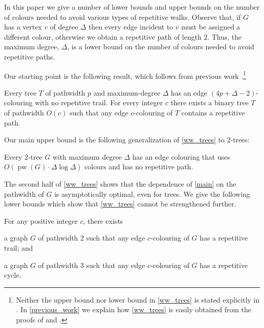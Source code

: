 \documentclass[kpfonts]{patmorin}
\DeclareMathOperator{\pw}{pw}
\begin{document}
In this paper we give a number of lower bounds and upper bounds on the number of colours needed to avoid various types of repetitive walks. Observe that, if $G$ has a vertex $v$ of degree $\Delta$ then every edge incident to $v$ must be assigned a different colour, otherwise we obtain a repetitive path of length $2$. Thus, the maximum degree, $\Delta$, is a lower bound on the number of colours needed to avoid repetitive paths.

Our starting point is the following result, which follows from previous work \cite{wilson.wood:anagram-free,kamcev.luczak.ea:anagram-free}.\footnote{Neither the upper bound nor lower bound in \cref{ww_trees} is stated explicitly in \cite{wilson.wood:anagram-free,kamcev.luczak.ea:anagram-free}.  In \cref{previous_work} we explain how \cref{ww_trees} is easily obtained from the proofs of \cite[Theorems~2 and 13]{wilson.wood:anagram-free} and \cite[Proposition~2.1]{kamcev.luczak.ea:anagram-free}.}

\begin{thm}\label{ww_trees}
    Every tree $T$ of pathwidth $p$ and maximum-degree $\Delta$ has an edge $(4p+\Delta-2)$-colouring with no repetitive trail.  For every integer $c$ there exists a binary tree $T$ of pathwidth $O(c)$ such that any edge $c$-colouring of $T$ contains a repetitive path.
\end{thm}

Our main upper bound is the following generalization of \cref{ww_trees} to $2$-trees:

\begin{thm}\label{main}
    Every $2$-tree $G$ with maximum degree $\Delta$ has an edge colouring that uses $O(\pw(G)\cdot\Delta\log\Delta)$ colours and has no repetitive path.
\end{thm}

The second half of \cref{ww_trees} shows that the dependence of \cref{main} on the pathwidth of $G$ is asymptotically optimal, even for trees.  We give the following lower bounds which show that \cref{ww_trees} cannot be strengthened further.

\begin{thm}\label{lower_bounds}
    For any positive integer $c$, there exists
    \begin{compactenum}[(a)]
        \item a graph $G$ of pathwidth $2$ such that any edge $c$-colouring of $G$ has a repetitive trail; and \label{trail_lower_bound}
        \item a graph $G$ of pathwidth $3$ such that any edge $c$-colouring of $G$ has a repetitive cycle.\label{cycle_lower_bound}
    \end{compactenum}
\end{thm}
\end{document}
